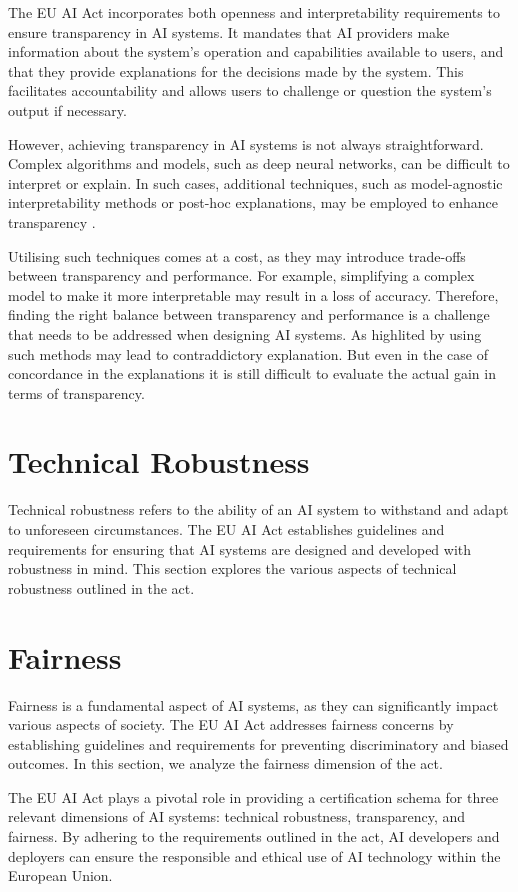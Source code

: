 \documentclass{article}
\begin{document}
The EU AI Act incorporates both openness and interpretability requirements to ensure transparency in AI systems. It mandates that AI providers make information about the system's operation and capabilities available to users, and that they provide explanations for the decisions made by the system. This facilitates accountability and allows users to challenge or question the system's output if necessary.


However, achieving transparency in AI systems is not always straightforward. Complex algorithms and models, such as deep neural networks, can be difficult to interpret or explain. In such cases, additional techniques, such as model-agnostic interpretability methods or post-hoc explanations, may be employed to enhance transparency \cite{}.


Utilising such techniques comes at a cost, as they may introduce trade-offs between transparency and performance. For example, simplifying a complex model to make it more interpretable may result in a loss of accuracy. Therefore, finding the right balance between transparency and performance is a challenge that needs to be addressed when designing AI systems.
As highlited by  using such methods may lead to contraddictory explanation.
But even in the case of concordance in the explanations it is still difficult to evaluate the actual gain in terms of transparency.

\section{Technical Robustness}

Technical robustness refers to the ability of an AI system to withstand and adapt to unforeseen circumstances. The EU AI Act establishes guidelines and requirements for ensuring that AI systems are designed and developed with robustness in mind. This section explores the various aspects of technical robustness outlined in the act.

\section{Fairness}

Fairness is a fundamental aspect of AI systems, as they can significantly impact various aspects of society. The EU AI Act addresses fairness concerns by establishing guidelines and requirements for preventing discriminatory and biased outcomes. In this section, we analyze the fairness dimension of the act.

The EU AI Act plays a pivotal role in providing a certification schema for three relevant dimensions of AI systems: technical robustness, transparency, and fairness. By adhering to the requirements outlined in the act, AI developers and deployers can ensure the responsible and ethical use of AI technology within the European Union.



\printbibliography
\end{document}
